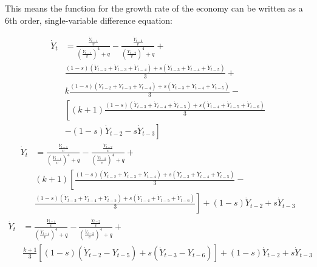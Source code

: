 This means the function for the growth rate of the economy can be written as a 6th order, single-variable difference equation:

\begin{equation*}
\begin{split}
    \dot Y_{t}& = \frac{\frac{\dot Y_{t-1}}{v}}{\left(\frac{\dot Y_{t-1}}{v}\right)^4+q}-\frac{\frac{\dot Y_{t-2}}{v}}{\left(\frac{\dot Y_{t-2}}{v}\right)^4+q} + \\
    & \frac{(1-s)(\dot Y_{t-2}+\dot Y_{t-3}+\dot Y_{t-4})+s(\dot Y_{t-3}+\dot Y_{t-4}+\dot Y_{t-5})}{3} + \\
    &k\frac{(1-s)(\dot Y_{t-2}+\dot Y_{t-3}+\dot Y_{t-4})+s(\dot Y_{t-3}+\dot Y_{t-4}+\dot Y_{t-5})}{3}-\\
    &\left[(k+1)\frac{(1-s)(\dot Y_{t-3}+\dot Y_{t-4}+\dot Y_{t-5})+s(\dot Y_{t-4}+\dot Y_{t-5}+\dot Y_{t-6})}{3}\right.\\
    &\left.-(1-s)\dot Y_{t-2}-s\dot Y_{t-3}\right]
\end{split}
\end{equation*}
\begin{equation*}
\begin{split}
    \dot Y_{t}& = \frac{\frac{\dot Y_{t-1}}{v}}{\left(\frac{\dot Y_{t-1}}{v}\right)^4+q}-\frac{\frac{\dot Y_{t-2}}{v}}{\left(\frac{\dot Y_{t-2}}{v}\right)^4+q} + \\
    & (k+1)\left[\frac{(1-s)(\dot Y_{t-2}+\dot Y_{t-3}+\dot Y_{t-4})+s(\dot Y_{t-3}+\dot Y_{t-4}+\dot Y_{t-5})}{3} -\right.\\
    & \left.\frac{(1-s)(\dot Y_{t-3}+\dot Y_{t-4}+\dot Y_{t-5})+s(\dot Y_{t-4}+\dot Y_{t-5}+\dot Y_{t-6})}{3}\right]+(1-s)\dot Y_{t-2}+s\dot Y_{t-3}
\end{split}
\end{equation*}
\begin{equation}
\begin{split}
    \dot Y_{t}& = \frac{\frac{\dot Y_{t-1}}{v}}{\left(\frac{\dot Y_{t-1}}{v}\right)^4+q}-\frac{\frac{\dot Y_{t-2}}{v}}{\left(\frac{\dot Y_{t-2}}{v}\right)^4+q} + \\
    & \frac{k+1}{3}\left[(1-s)(\dot Y_{t-2}-Y_{t-5})+s(\dot Y_{t-3}-Y_{t-6})\right]+(1-s)\dot Y_{t-2}+s\dot Y_{t-3}
\end{split}
\end{equation}

